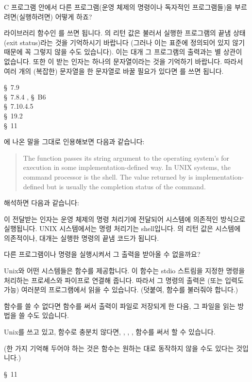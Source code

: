 \begin{faq}
	C 프로그램 안에서 다른 프로그램(운영 체제의 명령이나 독자적인
	프로그램들)을 부르려면(실행하려면) 어떻게 하죠?
	
\A
	라이브러리 함수인 를 쓰면 됩니다.
	의 리턴 값은 불러서 실행한 프로그램의 끝냄
	상태(exit status)라는 것을 기억하시기 바랍니다 (그러나
	이는 표준에 정의되어 있지 않기 때문에 꼭 그렇지 않을 수도
	있습니다).  이는
	대개 그 프로그램의 출력과는 별 상관이 없습니다.
	또한 이 받는 인자는 하나의 문자열이라는 것을
	기억하기 바랍니다.  따라서 여러 개의 (복잡한) 문자열을 한 문자열로
	바꿀 필요가 있다면 를 쓰면 됩니다.

\R
	\cite{kr1} \S\ 7.9  \\
	\cite{kr2} \S\ 7.8.4 , \S\ B6  \\
	\cite{c89} \S\ 7.10.4.5 \\
	\cite{hs} \S\ 19.2  \\
	\cite{pcs} \S\ 11 

\T
	\cite{hs}에 나온 말을 그대로 인용해보면 다음과 같습니다:
\begin{quote}
	The function  passes its string argument to the operating
	system's  for execution in some
	implementation-\-defined way.  In UNIX systems, the command
	processor is the shell.  The value returned by  is
	implementation-defined but is usually the completion status
	of the command.
\end{quote}
	해석하면 다음과 같습니다:

	이 전달받는 인자는 운영 체제의
	명령 처리기에 전달되어 시스템에 의존적인 방식으로 실행됩니다.
	UNIX 시스템에서는 명령 처리기는 shell입니다.
	의 리턴 값은 시스템에 의존적이나, 대개는
	실행한 명령의 끝냄 코드가 됩니다.

\end{faq}

\begin{faq}
	다른 프로그램이나 명령을 실행시켜서 그 출력을 받아올 수 없을까요?

\A
	Unix와 어떤 시스템들은  함수를 제공합니다.
	이 함수는 stdio 스트림을 지정한 명령을 처리하는 프로세스와
	파이프로 연결해 줍니다.  따라서 그 명령의 출력은 (또는 입력도 가능)
	여러분의 프로그램에서 읽을 수 있습니다.  (덧붙여, 
	함수를 불러줘야 합니다.)

	 함수를 쓸 수 없다면  함수를 써서
	출력이 파일로 저장되게 한 다음, 그 파일을 읽는 방법을 쓸 수도
	있습니다.

	Unix를 쓰고 있고,  함수로 충분치 않다면,
	, , ,  함수를
	써서 할 수 있습니다.

	(한 가지 기억해 두어야 하는 것은  함수는
	원하는 대로 동작하지 않을 수도 있다는 것입니다.)

\R
	\cite{pcs} \S\ 11 
\end{faq}


